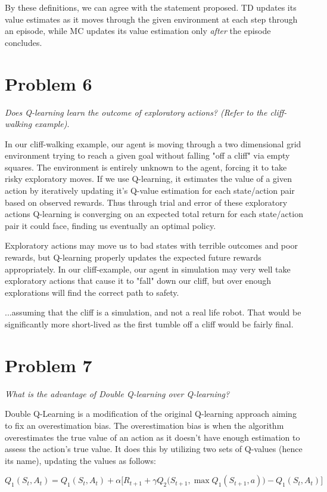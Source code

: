 \documentclass{article}
\begin{document}
By these definitions, we can agree with the statement proposed. TD updates its value estimates as it moves through the given environment at each step through an episode, while MC updates its value estimation only \textit{after} the episode concludes.

\section*{Problem 6}
\textit{Does Q-learning learn the outcome of exploratory actions? (Refer to the cliff-walking example)}.

In our cliff-walking example, our agent is moving through a two dimensional grid environment trying to reach a given goal without falling "off a cliff" via empty squares. The environment is entirely unknown to the agent, forcing it to take risky exploratory moves. If we use Q-learning, it estimates the value of a given action by iteratively updating it's Q-value estimation for each state/action pair based on observed rewards. Thus through trial and error of these exploratory actions Q-learning is converging on an expected total return for each state/action pair it could face, finding us eventually an optimal policy.

Exploratory actions may move us to bad states with terrible outcomes and poor rewards, but Q-learning properly updates the expected future rewards appropriately. In our cliff-example, our agent in simulation may very well take exploratory actions that cause it to "fall" down our cliff, but over enough explorations will find the correct path to safety.

...assuming that the cliff is a simulation, and not a real life robot. That would be significantly more short-lived as the first tumble off a cliff would be fairly final.


\section*{Problem 7}
\textit{What is the advantage of Double Q-learning over Q-learning?}

Double Q-Learning is a modification of the original Q-learning approach aiming to fix an overestimation bias. The overestimation bias is when the algorithm overestimates the true value of an action as it doesn't have enough estimation to assess the action's true value. It does this by utilizing two sets of Q-values (hence its name), updating the values as follows:

\begin{equation}
    Q_1(S_t, A_t) = Q_1(S_t, A_t) + \alpha \biggl[ R_{t+1} + \gamma Q_2 \bigl( S_{t+1}, \max Q_1(S_{t+1}, a) \bigr) - Q_1(S_t, A_t) \biggr]
\end{equation}
\end{document}
